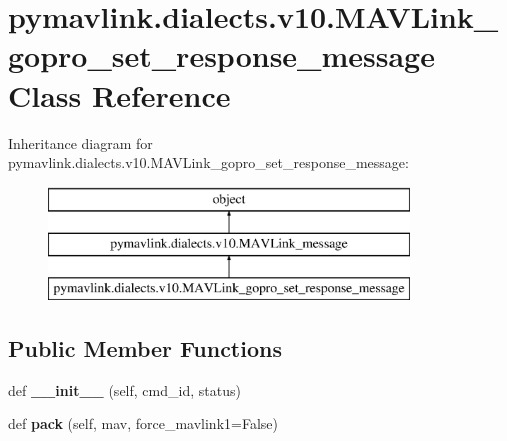 \hypertarget{classpymavlink_1_1dialects_1_1v10_1_1MAVLink__gopro__set__response__message}{}\section{pymavlink.\+dialects.\+v10.\+M\+A\+V\+Link\+\_\+gopro\+\_\+set\+\_\+response\+\_\+message Class Reference}
\label{classpymavlink_1_1dialects_1_1v10_1_1MAVLink__gopro__set__response__message}
Inheritance diagram for pymavlink.\+dialects.\+v10.\+M\+A\+V\+Link\+\_\+gopro\+\_\+set\+\_\+response\+\_\+message\+:\begin{figure}[H]
\begin{center}
\leavevmode
\includegraphics[height=3.000000cm]{classpymavlink_1_1dialects_1_1v10_1_1MAVLink__gopro__set__response__message}
\end{center}
\end{figure}
\subsection*{Public Member Functions}
\begin{DoxyCompactItemize}
\item 
\mbox{\label{classpymavlink_1_1dialects_1_1v10_1_1MAVLink__gopro__set__response__message_a8f5d458de1236709172c6a937849cea8}} 
def {\bfseries \+\_\+\+\_\+init\+\_\+\+\_\+} (self, cmd\+\_\+id, status)
\item 
\mbox{\label{classpymavlink_1_1dialects_1_1v10_1_1MAVLink__gopro__set__response__message_a23bde43e40bbd13aedd6607d40366f4c}} 
def {\bfseries pack} (self, mav, force\+\_\+mavlink1=False)
\end{DoxyCompactItemize}
